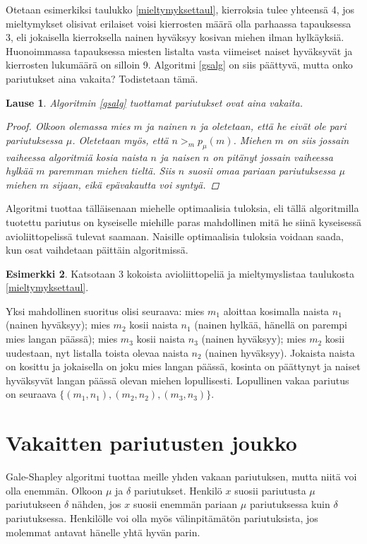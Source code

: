 \documentclass[finnish]{tktltiki2}
\newtheorem{lau}{Lause}
\theoremstyle{definition}
\newtheorem{esim}[lau]{Esimerkki}
\theoremstyle{remark}
\begin{document}
Otetaan esimerkiksi taulukko \ref{mieltymyksettaul}, kierroksia tulee yhteensä 4, jos mieltymykset olisivat erilaiset voisi kierrosten määrä olla parhaassa tapauksessa 3, eli jokaisella kierroksella nainen hyväksyy kosivan miehen ilman hylkäyksiä. Huonoimmassa tapauksessa miesten listalta vasta viimeiset naiset hyväksyvät ja kierrosten lukumäärä on silloin 9.
Algoritmi \ref{gsalg} on siis päättyvä, mutta onko pariutukset aina vakaita?
Todistetaan tämä.
\begin{lau}
Algoritmin \ref{gsalg} tuottamat pariutukset ovat aina vakaita.
\begin{proof}\cite[s. 588]{gale62a}
Olkoon olemassa mies $m$ ja nainen $n$ ja oletetaan, että he eivät ole pari pariutuksessa $\mu$. Oletetaan myös, että $n >_{m} p_{\mu}(m)$. Miehen $m$ on siis jossain vaiheessa algoritmiä kosia naista $n$ ja naisen $n$ on pitänyt jossain vaiheessa hylkää $m$ paremman miehen tieltä. Siis $n$ suosii omaa pariaan pariutuksessa $\mu$ miehen $m$ sijaan, eikä epävakautta voi syntyä.
\end{proof}
\end{lau}
Algoritmi tuottaa tälläisenaan miehelle optimaalisia tuloksia, eli tällä algoritmilla tuotettu pariutus on kyseiselle miehille paras mahdollinen mitä he siinä kyseisessä avioliittopelissä tulevat saamaan.
Naisille optimaalisia tuloksia voidaan saada, kun osat vaihdetaan päittäin algoritmissä.

\begin{esim}
	Katsotaan 3 kokoista avioliittopeliä ja mieltymyslistaa taulukosta \ref{mieltymyksettaul}.
	
	Yksi mahdollinen suoritus olisi seuraava: mies $m_1$ aloittaa kosimalla naista $n_1$ (nainen hyväksyy); mies $m_2$ kosii naista $n_1$ (nainen hylkää, hänellä on parempi mies langan päässä); mies $m_3$ kosii naista $n_3$ (nainen hyväksyy); mies $m_2$ kosii uudestaan, nyt listalla toista olevaa naista $n_2$ (nainen hyväksyy). Jokaista naista on kosittu ja jokaisella on joku mies langan päässä, kosinta on päättynyt ja naiset hyväksyvät langan päässä olevan miehen lopullisesti. Lopullinen vakaa pariutus on seuraava $\{(m_1, n_1), (m_2, n_2), (m_3, n_3)\}$.
\end{esim}

\section{Vakaitten pariutusten joukko}
Gale-Shapley algoritmi tuottaa meille yhden vakaan pariutuksen, mutta niitä voi olla enemmän.
Olkoon $\mu$ ja $\delta$ pariutukset. Henkilö $x$ suosii pariutusta $\mu$ pariutukseen $\delta$ nähden, jos $x$ suosii enemmän pariaan $\mu$ pariutuksessa kuin $\delta$ pariutuksessa. Henkilölle voi olla myös välinpitämätön pariutuksista, jos molemmat antavat hänelle yhtä hyvän parin.
\end{document}
